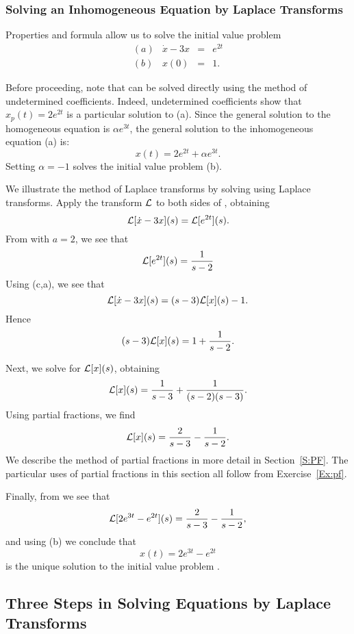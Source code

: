 \subsubsection*{Solving an Inhomogeneous Equation by Laplace Transforms}

Properties  and formula  allow us to solve the 
initial value problem 
\begin{equation} \label{eq:expODE}
\begin{array}{crcl}
(a) & \dot{x} - 3x & = & e^{2t}\\
(b) & x(0) & = & 1.
\end{array}
\end{equation}

Before proceeding, note that  can be solved directly using
the method of undetermined coefficients.    
Indeed, undetermined coefficients show that $x_p(t) = 2e^{2t}$ is a 
particular solution to (a).  Since the general solution to the 
homogeneous equation is $\alpha e^{3t}$, the general solution to the 
inhomogeneous equation (a) is:
\[
x(t) = 2e^{2t} + \alpha e^{3t}.
\]
Setting $\alpha=-1$ solves the initial value problem (b).

We illustrate the method of Laplace transforms by solving  
using Laplace transforms.  Apply the transform ${\cal L}$ to both sides of 
, obtaining 
\[
{\cal L}[\dot{x}-3x](s) = {\cal L}[e^{2t}](s).
\]
From  with $a=2$, we see that
\[
{\cal L}[e^{2t}](s) = \frac{1}{s-2}
\]
Using (c,a), we see that  
\[
{\cal L}[\dot{x}-3x](s) = (s-3){\cal L}[x](s) - 1.
\]
Hence 
\[
(s-3){\cal L}[x](s) = 1 + \frac{1}{s-2}.
\]

Next, we solve for ${\cal L}[x](s)$, obtaining
\[
{\cal L}[x](s) = \frac{1}{s-3} + \frac{1}{(s-2)(s-3)}.
\]
Using partial fractions, we find  
\[
{\cal L}[x](s)  = \frac{2}{s-3} - \frac{1}{s-2}.
\]
We describe the method of partial fractions in more detail in 
Section~\ref{S:PF}.  The particular uses of partial fractions in this section 
all follow from Exercise~\ref{Ex:pf}. 

Finally, from  we see that 
\[
{\cal L}[2e^{3t}-e^{2t}](s) = \frac{2}{s-3} - \frac{1}{s-2},
\]
and using (b) we conclude that
\[
x(t) = 2e^{3t}-e^{2t} 
\]
is the unique solution to the initial value problem . 

\subsection*{Three Steps in Solving Equations by Laplace Transforms} 

